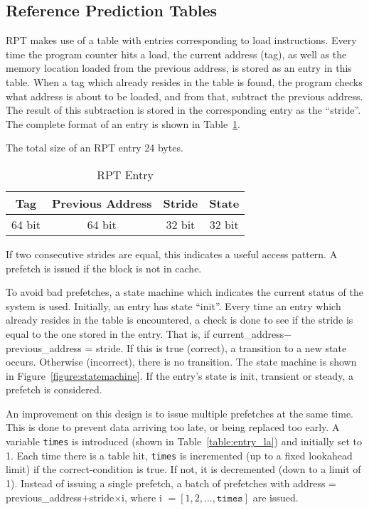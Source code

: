 \subsection{Reference Prediction Tables}

RPT makes use of a table with entries corresponding to load
instructions. Every time the program counter hits a load, the current
address (tag), as well as the memory location loaded from the previous
address, is stored as an entry in this table. When a tag which already
resides in the table is found, the program checks what address is about
to be loaded, and from that, subtract the previous address. The result
of this subtraction is stored in the corresponding entry as the
``stride''. The complete format of an entry is shown in
Table~\ref{table:entry}.

The total size of an RPT entry 24 bytes.

\begin{table}[h]
  \centering
  \begin{tabular}{ | c | c | c | c |}
    \hline
    Tag & Previous Address & Stride & State \\ \hline
    64 bit & 64 bit & 32 bit & 32 bit \\ \hline
  \end{tabular}
  \caption{RPT Entry}
  \label{table:entry}
\end{table}

If two consecutive strides are equal, this indicates a useful access
pattern. A prefetch is issued if the block is not in cache.

To avoid bad prefetches, a state machine which indicates the current
status of the system is used. Initially, an entry has state
``init''. Every time an entry which already resides in the table is
encountered, a check is done to see if the stride is equal to the one
stored in the entry. That is, if current\_address$ -
$previous\_address = stride. If this is true (correct), a transition
to a new state occurs. Otherwise (incorrect), there is no
transition. The state machine is shown in
Figure~\ref{figure:statemachine}. If the entry's state is init,
transient or steady, a prefetch is considered.

An improvement on this design is to issue multiple prefetches at the
same time. This is done to prevent data arriving too late, or being
replaced too early. A variable \texttt{times} is introduced (shown in
Table~\ref{table:entry_la}) and initially set to 1. Each time there is
a table hit, \texttt{times} is incremented (up to a fixed lookahead
limit) if the correct-condition is true. If not, it is decremented
(down to a limit of 1). Instead of issuing a single prefetch, a batch
of prefetches with address = previous\_address$ + $stride$\times$i,
where i $= [1, 2, \ldots, \texttt{times}]$ are issued.

